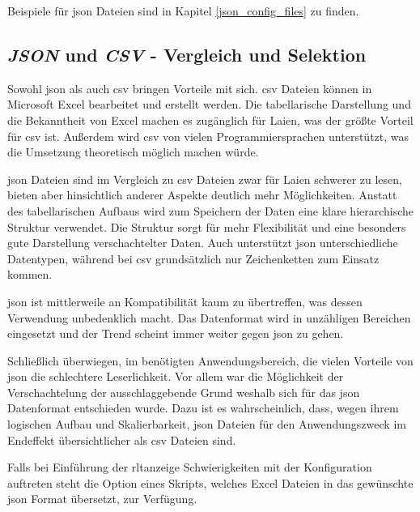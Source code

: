 Beispiele für \ac{json} Dateien sind in Kapitel \ref{json_config_files} zu finden.

\subsection{\textit{JSON} und \textit{CSV} - Vergleich und Selektion} \label{json_vs_csv}
Sowohl \ac{json} als auch \ac{csv} bringen Vorteile mit sich. 
\ac{csv} Dateien können in Microsoft Excel bearbeitet und erstellt werden. Die tabellarische Darstellung und die Bekanntheit von Excel machen es zugänglich für Laien, was der größte Vorteil für \ac{csv} ist. Außerdem wird \ac{csv} von vielen Programmiersprachen unterstützt, was die Umsetzung theoretisch möglich machen würde. 

\ac{json} Dateien sind im Vergleich zu \ac{csv} Dateien zwar für Laien schwerer zu lesen, bieten aber hinsichtlich anderer Aspekte deutlich mehr Möglichkeiten. Anstatt des tabellarischen Aufbaus wird zum Speichern der Daten eine klare hierarchische Struktur verwendet. Die Struktur sorgt für mehr Flexibilität und eine besonders gute Darstellung verschachtelter Daten. Auch unterstützt \ac{json} unterschiedliche Datentypen, während bei \ac{csv} grundsätzlich nur Zeichenketten zum Einsatz kommen.

\ac{json} ist mittlerweile an Kompatibilität kaum zu übertreffen, was dessen Verwendung unbedenklich macht. Das Datenformat wird in unzähligen Bereichen eingesetzt und der Trend scheint immer weiter gegen \ac{json} zu gehen.

Schließlich überwiegen, im benötigten Anwendungsbereich, die vielen Vorteile von \ac{json} die schlechtere Leserlichkeit. Vor allem war die Möglichkeit der Verschachtelung der ausschlaggebende Grund weshalb sich für das \ac{json} Datenformat entschieden wurde. Dazu ist es wahrscheinlich, dass, wegen ihrem logischen Aufbau und  Skalierbarkeit, \ac{json} Dateien für den Anwendungszweck im Endeffekt übersichtlicher als \ac{csv} Dateien sind.

Falls bei Einführung der \ac{rltanzeige} Schwierigkeiten mit der Konfiguration auftreten steht \zB die Option eines Skripts, welches Excel Dateien in das gewünschte \ac{json} Format übersetzt, zur Verfügung.

